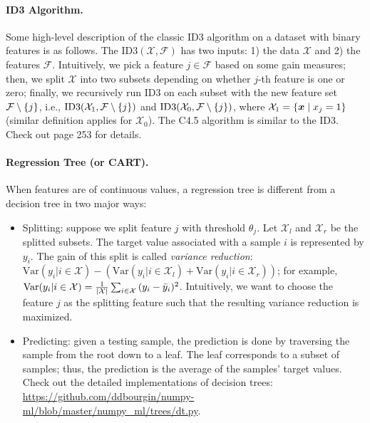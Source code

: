     \paragraph{ID3 Algorithm.} Some high-level description of the classic ID3 algorithm on a dataset with binary features is as follows.
    The $\text{ID3}(\mathcal{X}, \mathcal{F})$ has two inputs: 1) the data $\mathcal{X}$ and 2) the features $\mathcal{F}$.
    Intuitively, we pick a feature $j \in \mathcal{F}$ based on some gain measures; then, we split $\mathcal{X}$ into two subsets depending on whether $j$-th feature is one or zero; finally, we recursively run ID3 on each subset  with the new feature set $\mathcal{F} \setminus \{ j \}$, i.e., $\text{ID3}(\mathcal{X}_1, \mathcal{F} \setminus \{ j \})$ and $\text{ID3}(\mathcal{X}_0, \mathcal{F} \setminus \{ j \})$, where $\mathcal{X}_1 = \{ \bm{x} \mid x_j = 1 \}$ (similar definition applies for $\mathcal{X}_0$).
    The C4.5 algorithm is similar to the ID3. 
    Check out \cite{shalev2014understanding} page 253 for details. 

    \paragraph{Regression Tree (or CART).} 
    When features are of continuous values, a regression tree is different from a decision tree in two major ways:
        \begin{itemize}
            \item Splitting: suppose we split feature $j$ with threshold $\theta_j$.
            Let $\mathcal{X}_l$ and $\mathcal{X}_r$ be the splitted subsets. 
            The target value associated with a sample $i$ is represented by $y_i$.
            The gain of this split is called \emph{variance reduction}:
            $\text{Var}(y_i | i \in \mathcal{X}) - \left( \text{Var}(y_i | i \in \mathcal{X}_l) + \text{Var}(y_i | i \in \mathcal{X}_r) \right)$; for example, $\text{Var}(y_i | i \in \mathcal{X}) = \frac{1}{| \mathcal{X} |}\sum_{i \in \mathcal{X}}^{}{(y_i - \bar{y}_i)^2}$. Intuitively, we want to choose the feature $j$ as the splitting feature such that the resulting variance reduction is maximized.
            \item Predicting: given a testing sample, the prediction is done by traversing the sample from the root down to a leaf.
            The leaf corresponds to a subset of samples; thus, the prediction is the average of the samples' target values.
            Check out the detailed implementations of decision trees: \url{https://github.com/ddbourgin/numpy-ml/blob/master/numpy_ml/trees/dt.py}.
        \end{itemize}
        
